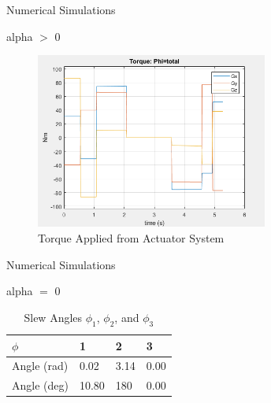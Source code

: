 \documentclass{beamer}
\begin{document}
\begin{frame}{Numerical Simulations}
	\begin{block}{alpha $>$ 0}
		
		\begin{figure}[H]
			\label{fig:torque_total}
			\begin{center}
				\includegraphics[width=3in]{figures/alphaNot0/torque_total.png}
			\end{center}
			\caption{Torque Applied from Actuator System}
		\end{figure}
		
	\end{block}
\end{frame}
\begin{frame}{Numerical Simulations}
	\begin{block}{alpha $=$ 0}
		
		\begin{table}[H]
			\centering
			\caption{Slew Angles $\phi_1$, $\phi_2$, and $\phi_3$}
			\begin{tabular}{llll}
				\toprule
				\midrule
				$\phi$ & 1 & 2 & 3 \\
				\midrule
				Angle (rad) & 0.02 & 3.14 & 0.00 \\
				Angle (deg) & 10.80 & 180 & 0.00 \\ 
				\midrule
				\bottomrule
			\end{tabular}%
			\label{tab:FOG_SF}%
		\end{table}%
		
	\end{block}
\end{frame}
\end{document}
